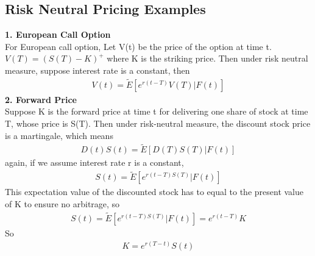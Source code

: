 \documentclass[a4paper]{article}
\begin{document}
\subsection{Risk Neutral Pricing Examples}
{\bf 1. European Call Option}\\
For European call option, Let V(t) be the price of the option at time t.  $V(T) = (S(T) - K)^{+}$ where K is the striking price. Then under risk neutral measure, suppose interest rate is a constant, then
\begin{align*}
	V(t) = \tilde E[e^{r(t-T)}V(T)|F(t)]
\end{align*}
{\bf 2. Forward Price}\\
Suppose K is the forward price at time t for delivering one share of stock at time T, whose price is S(T). Then under risk-neutral measure, the discount stock price is a martingale, which means
\begin{align*}
	D(t)S(t) = \tilde E[D(T) S(T)|F(t)]
\end{align*}
again, if we assume interest rate r is a constant,
\begin{align*}
	S(t) = \tilde E[e^{r(t-T)S(T)}|F(t)]
\end{align*}
This expectation value of the discounted stock has to equal to the present value of K to ensure no arbitrage, so
\begin{align*}
	S(t) = \tilde E[e^{r(t-T)S(T)}|F(t)] = e^{r(t-T)}K
\end{align*}
So
\begin{align*}
	K = e^{r(T-t)}S(t)
\end{align*}
\end{document}
